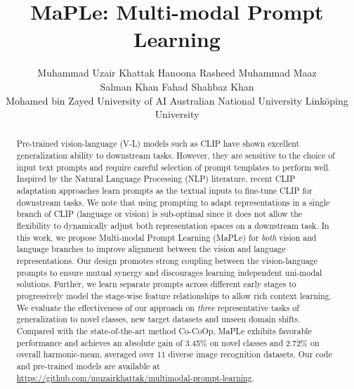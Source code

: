 \documentclass[10pt,twocolumn,letterpaper]{article}
\begin{document}
\title{{MaPLe}: \textbf{M}ulti-mod\textbf{a}l \textbf{P}rompt \textbf{Le}arning}




 \author{
  Muhammad Uzair Khattak \quad 
  Hanoona Rasheed \quad 
  Muhammad Maaz \\
  Salman Khan \quad
  Fahad Shahbaz Khan
  \vspace{0.2em} \\
  Mohamed bin Zayed University of AI \quad 
  Australian National University \quad 
  Link\"{o}ping University
}

\maketitle
\begin{abstract}


Pre-trained vision-language (V-L) models such as CLIP have shown excellent generalization ability to downstream tasks. However, they are sensitive to the choice of input text prompts and require careful selection of prompt templates to perform well. Inspired by the Natural Language Processing (NLP) literature, recent CLIP adaptation approaches learn prompts as the textual inputs to fine-tune CLIP for downstream tasks. We note that using prompting to adapt representations in a single branch of CLIP (language or vision) is sub-optimal since it does not allow the flexibility to dynamically adjust both representation spaces on a downstream task. In this work, we propose Multi-modal Prompt Learning (MaPLe) for \emph{both} vision and language branches to improve alignment between the vision and language representations. Our design promotes strong coupling between the vision-language prompts to ensure mutual synergy and discourages learning independent uni-modal solutions. Further, we learn separate prompts across different early stages to progressively model the stage-wise feature relationships to allow rich context learning. We evaluate the effectiveness of our approach on \emph{three} representative tasks of generalization to novel classes, new target datasets and unseen domain shifts. {Compared with the state-of-the-art method Co-CoOp, MaPLe exhibits favorable performance and achieves an absolute gain of 3.45\% on novel classes and 2.72\% on overall harmonic-mean, averaged over 11 diverse image recognition datasets.} Our code and pre-trained models are available at \href{https://github.com/muzairkhattak/multimodal-prompt-learning}{https://github.com/muzairkhattak/multimodal-prompt-learning}.
\end{abstract}
\end{document}
